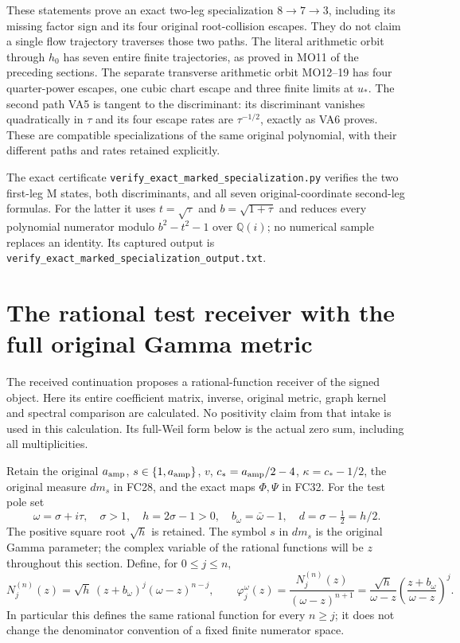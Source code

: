 \documentclass[11pt]{article}
\begin{document}
These statements prove an exact two-leg specialization
$8\to7\to3$, including its missing factor sign and its
four original root-collision escapes. They do not claim a
single flow trajectory traverses those two paths. The
literal arithmetic orbit through $h_0$ has seven entire
finite trajectories, as proved in MO11 of the preceding sections.
The separate transverse arithmetic orbit MO12--19 has
four quarter-power escapes, one cubic chart escape and
three finite limits at $u_*$. The second path VA5 is
tangent to the discriminant: its discriminant vanishes
quadratically in $\tau$ and its four escape rates are
$\tau^{-1/2}$, exactly as VA6 proves. These are compatible
specializations of the same original polynomial, with
their different paths and rates retained explicitly.

The exact certificate
\texttt{verify\_exact\_marked\_specialization.py} verifies
the two first-leg M states, both discriminants, and all
seven original-coordinate second-leg formulas. For the
latter it uses $t=\sqrt\tau$ and $b=\sqrt{1+\tau}$ and
reduces every polynomial numerator modulo $b^2-t^2-1$
over $\mathbb Q(i)$; no numerical sample replaces an
identity. Its captured output is
\texttt{verify\_exact\_marked\_specialization\_output.txt}.

\section{The rational test receiver with the full original Gamma metric}
The received continuation \cite[Equations (33)--(36)]{ResidueIntake}
proposes a rational-function receiver of the signed object. Here its
entire coefficient matrix, inverse, original metric, graph kernel and
spectral comparison are calculated. No positivity claim from that
intake is used in this calculation. Its full-Weil form below is the
actual zero sum, including all multiplicities.

Retain the original $a_{\rm amp}$, $s\in\{1,a_{\rm amp}\}$,
$v$, $c_*=a_{\rm amp}/2-4$, $\kappa=c_*-1/2$,
the original measure $dm_s$ in FC28, and the exact maps
$\Phi,\Psi$ in FC32. For the test pole set
\[
 \omega=\sigma+i\tau,\quad\sigma>1,\quad
 h=2\sigma-1>0,\quad b_\omega=\bar\omega-1,\quad
 d=\sigma-\tfrac12=h/2.
 \tag{RW1}
\]
The positive square root $\sqrt h$ is retained. The symbol $s$ in
$dm_s$ is the original Gamma parameter; the complex variable of
the rational functions will be $z$ throughout this section.
Define, for $0\le j\le n$,
\[
 N_j^{(n)}(z)=\sqrt h\,(z+b_\omega)^j(\omega-z)^{n-j},\qquad
 \varphi_j^\omega(z)=\frac{N_j^{(n)}(z)}{(\omega-z)^{n+1}}
 =\frac{\sqrt h}{\omega-z}
           \left(\frac{z+b_\omega}{\omega-z}\right)^j.
 \tag{RW2}
\]
In particular this defines the same rational function for every
$n\ge j$; it does not change the denominator convention of a
fixed finite numerator space.
\end{document}

